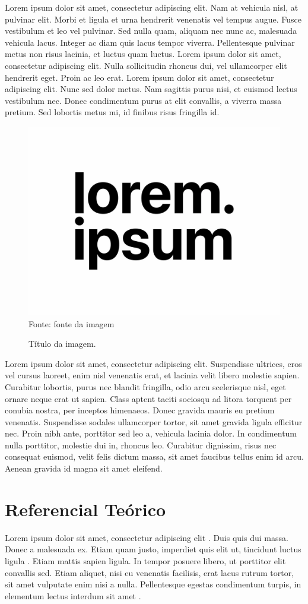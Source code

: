 \documentclass[a4paper, 12pt]{article}
\begin{document}
Lorem ipsum dolor sit amet, consectetur adipiscing elit. Nam at vehicula nisl, at pulvinar elit. Morbi et ligula et urna hendrerit venenatis vel tempus augue. Fusce vestibulum et leo vel pulvinar. Sed nulla quam, aliquam nec nunc ac, malesuada vehicula lacus. Integer ac diam quis lacus tempor viverra. Pellentesque pulvinar metus non risus lacinia, et luctus quam luctus. Lorem ipsum dolor sit amet, consectetur adipiscing elit. Nulla sollicitudin rhoncus dui, vel ullamcorper elit hendrerit eget. Proin ac leo erat. Lorem ipsum dolor sit amet, consectetur adipiscing elit. Nunc sed dolor metus. Nam sagittis purus nisi, et euismod lectus vestibulum nec. Donec condimentum purus at elit convallis, a viverra massa pretium. Sed lobortis metus mi, id finibus risus fringilla id.

\begin{figure}[!htb]
    \centering
    \caption{Título da imagem.}
    \includegraphics[width=0.5\linewidth]{imagens/image.png}\\
    {\footnotesize Fonte: fonte da imagem}
    \label{fig:enter-label}
\end{figure}

Lorem ipsum dolor sit amet, consectetur adipiscing elit. Suspendisse ultrices, eros vel cursus laoreet, enim nisl venenatis erat, et lacinia velit libero molestie sapien. Curabitur lobortis, purus nec blandit fringilla, odio arcu scelerisque nisl, eget ornare neque erat ut sapien. Class aptent taciti sociosqu ad litora torquent per conubia nostra, per inceptos himenaeos. Donec gravida mauris eu pretium venenatis. Suspendisse sodales ullamcorper tortor, sit amet gravida ligula efficitur nec. Proin nibh ante, porttitor sed leo a, vehicula lacinia dolor. In condimentum nulla porttitor, molestie dui in, rhoncus leo. Curabitur dignissim, risus nec consequat euismod, velit felis dictum massa, sit amet faucibus tellus enim id arcu. Aenean gravida id magna sit amet eleifend.
\newpage

\section{Referencial Teórico}
Lorem ipsum dolor sit amet, consectetur adipiscing elit \cite{ipsum2021article}.
Duis quis dui massa. Donec a malesuada ex. Etiam quam justo, imperdiet quis elit ut,
tincidunt luctus ligula \cite{lorem2020book}. 
Etiam mattis sapien ligula. In tempor posuere libero, ut porttitor elit convallis sed.
Etiam aliquet, nisi eu venenatis facilisis, erat lacus rutrum tortor, sit amet vulputate enim nisi a nulla.
Pellentesque egestas condimentum turpis, in elementum lectus interdum sit amet \cite{dolor2022conf}.
\end{document}

